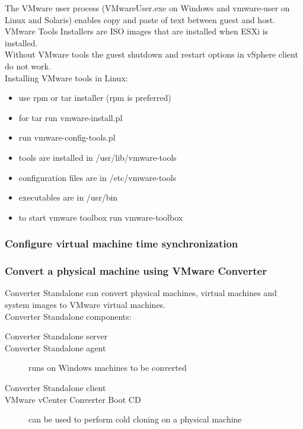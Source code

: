 The VMware user process (VMwareUser.exe on Windows and vmware-user on Linux
and Solaris) enables copy and paste of text between guest and host.\\

VMware Tools Installers are ISO images that are installed when ESXi is
installed.\\

Without VMware tools the guest shutdown and restart options in vSphere client
do not work.\\

Installing VMware tools in Linux:

\begin{itemize}
\item use rpm or tar installer (rpm is preferred)
\item for tar run vmware-install.pl
\item run vmware-config-tools.pl
\item tools are installed in /usr/lib/vmware-tools
\item configuration files are in /etc/vmware-tools
\item executables are in /usr/bin
\item to start vmware toolbox run vmware-toolbox
\end{itemize}

\subsubsection{Configure virtual machine time synchronization}

\subsubsection{Convert a physical machine using VMware Converter}

Converter Standalone can convert physical machines, virtual machines and
system images to VMware virtual machines.\\

Converter Standalone components:\\

\begin{description}

\item[Converter Standalone server]

\item[Converter Standalone agent]
runs on Windows machines to be converted

\item[Converter Standalone client]

\item[VMware vCenter Converter Boot CD]
can be used to perform cold cloning on a physical machine

\end{description}

